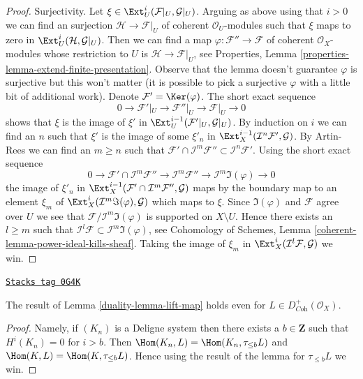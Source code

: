 \begin{proof}
\medskip\noindent
Surjectivity. Let $\xi \in \Ext^i_U(\mathcal{F}|_U, \mathcal{G}|_U)$.
Arguing as above using that $i > 0$ we can find an surjection
$\mathcal{H} \to \mathcal{F}|_U$ of coherent $\mathcal{O}_U$-modules
such that $\xi$ maps to zero in $\Ext^i_U(\mathcal{H}, \mathcal{G}|_U)$.
Then we can find a map $\varphi : \mathcal{F}'' \to \mathcal{F}$
of coherent $\mathcal{O}_X$-modules whose restriction to $U$ is
$\mathcal{H} \to \mathcal{F}|_U$, see
Properties, Lemma \ref{properties-lemma-extend-finite-presentation}.
Observe that the lemma doesn't guarantee $\varphi$ is surjective
but this won't matter (it is possible to pick a surjective $\varphi$
with a little bit of additional work).
Denote $\mathcal{F}' = \Ker(\varphi)$. The short exact sequence
$$
0 \to \mathcal{F}'|_U \to \mathcal{F}''|_U \to \mathcal{F}|_U \to 0
$$
shows that $\xi$ is the image of $\xi'$ in
$\Ext^{i - 1}_U(\mathcal{F}'|_U, \mathcal{G}|_U)$.
By induction on $i$ we can find an $n$ such that
$\xi'$ is the image of some $\xi'_n$ in
$\Ext^{i - 1}_X(\mathcal{I}^n\mathcal{F}', \mathcal{G})$.
By Artin-Rees we can find an $m \geq n$ such that
$\mathcal{F}' \cap \mathcal{I}^m\mathcal{F}'' \subset
\mathcal{I}^n\mathcal{F}'$. Using the short exact sequence
$$
0 \to \mathcal{F}' \cap \mathcal{I}^m\mathcal{F}'' \to
\mathcal{I}^m\mathcal{F}'' \to \mathcal{I}^m\Im(\varphi) \to 0
$$
the image of $\xi'_n$ in
$\Ext^{i - 1}_X(\mathcal{F}' \cap \mathcal{I}^m\mathcal{F}'', \mathcal{G})$
maps by the boundary map to an element $\xi_m$ of
$\Ext^i_X(\mathcal{I}^m\Im(\varphi), \mathcal{G})$ which maps
to $\xi$. Since $\Im(\varphi)$ and $\mathcal{F}$ agree over $U$
we see that $\mathcal{F}/\mathcal{I}^m\Im(\varphi)$ is supported
on $X \setminus U$. Hence there exists an $l \geq m$
such that $\mathcal{I}^l\mathcal{F} \subset \mathcal{I}^m\Im(\varphi)$, see
Cohomology of Schemes, Lemma \ref{coherent-lemma-power-ideal-kills-sheaf}.
Taking the image of $\xi_m$ in
$\Ext^i_X(\mathcal{I}^l\mathcal{F}, \mathcal{G})$ we win.
\end{proof}

\begin{lemma}
\label{duality-lemma-lift-map-plus}
\href{https://stacks.math.columbia.edu/tag/0G4K}{\texttt{Stacks tag 0G4K}}

The result of Lemma \ref{duality-lemma-lift-map} holds even for
$L \in D^+_{\textit{Coh}}(\mathcal{O}_X)$.
\end{lemma}

\begin{proof}
Namely, if $(K_n)$ is a Deligne system then there exists a
$b \in \mathbf{Z}$ such that $H^i(K_n) = 0$ for $i > b$.
Then $\Hom(K_n, L) = \Hom(K_n, \tau_{\leq b}L)$ and
$\Hom(K, L) = \Hom(K, \tau_{\leq b}L)$. Hence using
the result of the lemma for $\tau_{\leq b}L$ we win.
\end{proof}

